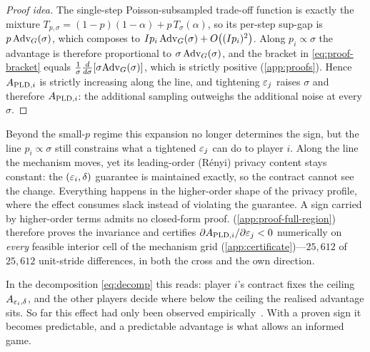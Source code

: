 \begin{proof}[Proof idea]
The single-step Poisson-subsampled trade-off function is exactly
the mixture $T_{p,\sigma} = (1-p)(1-\alpha) + p\,T_\sigma(\alpha)$,
so its per-step sup-gap is $p\,\mathrm{Adv}_G(\sigma)$, which composes to
$I p_i\,\mathrm{Adv}_G(\sigma) + O\bigl((I p_i)^2\bigr)$. Along $p_i
\propto \sigma$ the advantage is therefore proportional to
$\sigma\,\mathrm{Adv}_G(\sigma)$, and the bracket in
\eqref{eq:proof-bracket} equals
$\frac{1}{\sigma}\frac{d}{d\sigma}[\sigma \mathrm{Adv}_G(\sigma)]$, which
is strictly positive (\cref{app:proofs}). Hence $A_{\mathrm{PLD},i}$ is
strictly increasing along the line, and tightening $\varepsilon_j$ raises
$\sigma$ and therefore $A_{\mathrm{PLD},i}$: the additional sampling
outweighs the additional noise at every $\sigma$.
\end{proof}

Beyond the small-$p$ regime this expansion no longer determines the
sign, but the line $p_i \propto \sigma$ still constrains what a
tightened $\varepsilon_j$ can do to player $i$. Along the line the
mechanism moves, yet its leading-order (R\'enyi) privacy content
stays constant: the $(\varepsilon_i,\delta)$ guarantee is maintained
exactly, so the contract cannot see the change. Everything happens
in the higher-order shape of the privacy profile, where the effect
consumes slack instead of violating the guarantee. A sign carried
by higher-order terms admits no closed-form proof.
 (\cref{app:proof-full-region})
therefore proves the invariance and certifies $\partial
A_{\mathrm{PLD},i}/\partial\varepsilon_j < 0$ numerically on \emph{every} feasible
interior cell of the mechanism grid
(\cref{app:certificate})---$25{,}612$ of $25{,}612$ unit-stride
differences, in both the cross and the own direction.

In the decomposition \eqref{eq:decomp} this reads: player $i$'s
contract fixes the ceiling $A_{\varepsilon_i,\delta}$, and the other
players decide where below the ceiling the realised advantage sits.
So far this effect had only been observed
empirically~\cite{kaiser2026your}. With a proven sign it becomes
predictable, and a predictable advantage is what allows an informed
game.

